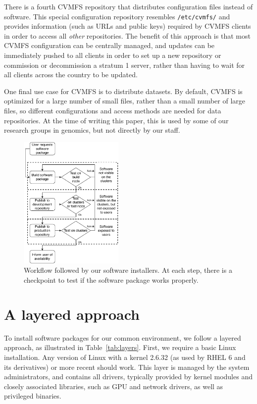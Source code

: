 \documentclass[sigconf]{acmart}
\begin{document}
There is a fourth CVMFS repository that distributes configuration files instead of software. This special configuration repository resembles \texttt{/etc/cvmfs/} and provides information (such as URLs and public keys) required by CVMFS clients in order to access all {\it other} repositories. The benefit of this approach is that most CVMFS configuration can be centrally managed, and updates can be immediately pushed to all clients in order to set up a new repository or commission or decommission a stratum 1 server, rather than having to wait for all clients across the country to be updated.

One final use case for CVMFS is to distribute datasets. By default, CVMFS  is optimized for a large number of small files, rather than a small number of large files, so different  configurations and access methods are needed for data repositories. At the time of writing this paper, this is used by some of our research groups in genomics, but not directly by our staff. 

\begin{figure}
  \includegraphics[width=0.45\textwidth]{Software-installation-workflow.pdf}
  \caption{Workflow followed by our software installers. At each step, there is a checkpoint to test if the software package works properly.}
  \label{fig:Workflow}
\end{figure}

\section{A layered approach}
\label{sec:Layered_environment}
To install software packages for our common environment, we follow a layered approach, as illustrated in Table~\ref{tab:layers}. First, we require a basic Linux installation. Any version of Linux with a kernel 2.6.32 (as used by RHEL 6 and its derivatives) or more recent should work. This layer is managed by the system administrators, and contains all drivers, typically provided by kernel modules and closely associated libraries, such as GPU and network drivers, as well as privileged binaries. 
\end{document}
